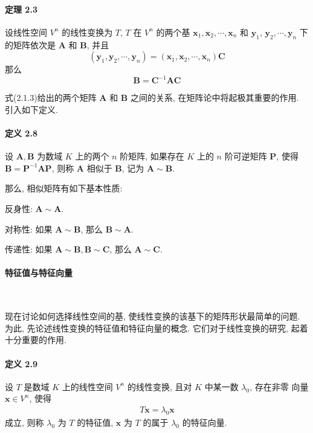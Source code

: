 \paragraph*{定理 2.3} 设线性空间 $V^n$ 的线性变换为 $T$, $T$ 在 $V^n$ 的两个基 $\bm{x}_1, \bm{x}_2, \cdots, \bm{x}_n$ 和 $\bm{y}_1$,
$\bm{y}_2, \cdots, \bm{y}_n$ 下的矩阵依次是 $\bm{A}$ 和 $\bm{B}$, 并且
$$
    (\bm{y}_1, \bm{y}_2, \cdots, \bm{y}_n) = (\bm{x}_1, \bm{x}_2, \cdots, \bm{x}_n) \bm{C}
$$
那么
\begin{equation}
    \bm{B} = \bm{C}^{-1}\bm{AC}
    \tag{2.1.3}
\end{equation}

\par 式(2.1.3)给出的两个矩阵 $\bm{A}$ 和 $\bm{B}$ 之间的关系, 在矩阵论中将起极其重要的作用. 引入如下定义.

\paragraph*{定义 2.8} 设 $\bm{A}, \bm{B}$ 为数域 $K$ 上的两个 $n$ 阶矩阵, 如果存在 $K$ 上的 $n$ 阶可逆矩阵 $\bm{P}$,
使得 $\bm{B} = \bm{P}^{-1}\bm{AP}$, 则称 $\bm{A}$ 相似于 $\bm{B}$, 记为 $\bm{A} \sim \bm{B}$.

\par 那么, 相似矩阵有如下基本性质:
\par 反身性: $\bm{A} \sim \bm{A}$.
\par 对称性: 如果 $\bm{A} \sim \bm{B}$, 那么 $\bm{B} \sim \bm{A}$.
\par 传递性: 如果 $\bm{A} \sim \bm{B}, \bm{B} \sim \bm{C}$, 那么 $\bm{A} \sim \bm{C}$.

\paragraph[]{特征值与特征向量} \

\par 现在讨论如何选择线性空间的基, 使线性变换的该基下的矩阵形状最简单的问题.
为此, 先论述线性变换的特征值和特征向量的概念. 它们对于线性变换的研究, 起着
十分重要的作用.

\paragraph*{定义 2.9} 设 $T$ 是数域 $K$ 上的线性空间 $V^n$ 的线性变换, 且对 $K$ 中某一数 $\lambda_0$, 存在非零
向量 $\bm{x} \in V^n$, 使得
\begin{gather}
    T\bm{x} = \lambda_0 \bm{x}
    \tag{2.1.4}
\end{gather}
成立, 则称 $\lambda_0$ 为 $T$ 的特征值, $\bm{x}$ 为 $T$ 的属于 $\lambda_0$ 的特征向量.

